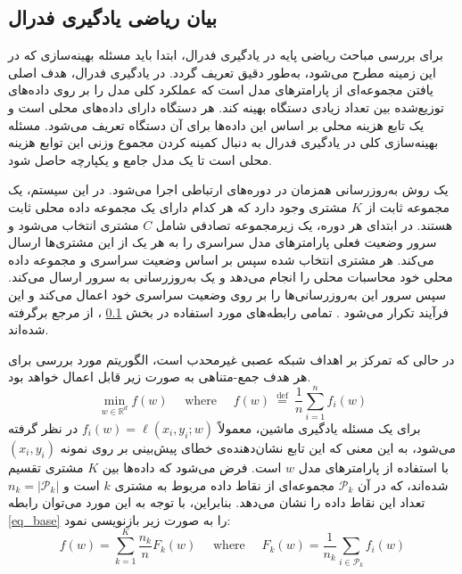 \subsection{
	بیان ریاضی یادگیری فدرال
}\label{sec_FL_math}
برای بررسی مباحث ریاضی پایه در یادگیری فدرال، ابتدا باید مسئله بهینه‌سازی که در این زمینه مطرح می‌شود، به‌طور دقیق تعریف گردد. در یادگیری فدرال، هدف اصلی یافتن مجموعه‌ای از پارامترهای مدل است که عملکرد کلی مدل را بر روی داده‌های توزیع‌شده بین تعداد زیادی دستگاه بهینه کند. هر دستگاه دارای داده‌های محلی است و یک تابع هزینه محلی بر اساس این داده‌ها برای آن دستگاه تعریف می‌شود. مسئله بهینه‌سازی کلی در یادگیری فدرال به دنبال کمینه کردن مجموع وزنی این توابع هزینه محلی است تا یک مدل جامع و یکپارچه حاصل شود.

یک روش به‌روزرسانی همزمان در دوره‌های ارتباطی اجرا می‌شود. در این سیستم، یک مجموعه ثابت از
$K$
مشتری وجود دارد که هر کدام دارای یک مجموعه داده محلی ثابت هستند. در ابتدای هر دوره، یک زیرمجموعه تصادفی شامل
$C$
مشتری‌ انتخاب می‌شود و سرور وضعیت فعلی پارامترهای مدل سراسری را به هر یک از این مشتری‌ها ارسال می‌کند. هر مشتری انتخاب ‌شده سپس بر اساس وضعیت سراسری و مجموعه داده محلی خود محاسبات محلی را انجام می‌دهد و یک به‌روزرسانی به سرور ارسال می‌کند. سپس سرور این به‌روزرسانی‌ها را بر روی وضعیت سراسری خود اعمال می‌کند و این فرآیند تکرار می‌شود
\cite{mcmahan2017communication}.
تمامی رابطه‌های مورد استفاده در بخش
\ref{sec_FL_math}%
، از مرجع 
\cite{mcmahan2017communication} 
برگرفته شده‌اند.

در حالی که تمرکز بر اهداف شبکه عصبی غیرمحدب%
است، الگوریتم مورد بررسی برای هر هدف جمع-متناهی%
به صورت زیر قابل اعمال خواهد بود.
\begin{equation}
	\min _{w \in \mathbb{R}^d} f(w) \quad \text { where } \quad f(w) \stackrel{\text { def }}{=} \frac{1}{n} \sum_{i=1}^n f_i(w)
	\label{eq_base}
\end{equation}
برای یک مسئله یادگیری ماشین، معمولاً
$f_i(w)=\ell\left(x_i, y_i ; w\right)$
در نظر گرفته می‌شود، به این معنی که این تابع نشان‌دهنده‌ی خطای پیش‌بینی بر روی نمونه
$(x_i, y_i)$
با استفاده از پارامترهای مدل
$w$
است. فرض می‌شود که داده‌ها بین
$K$
مشتری تقسیم شده‌اند، که در آن
$\mathcal{P}_k$
مجموعه‌ای از نقاط داده مربوط به مشتری
$k$
است و
$n_k=\left|\mathcal{P}_k\right|$
تعداد این نقاط داده را نشان می‌دهد. بنابراین، با توجه به این مورد می‌توان رابطه
\eqref{eq_base}
را به صورت زیر بازنویسی نمود:
\begin{equation}
	f(w)=\sum_{k=1}^K \frac{n_k}{n} F_k(w) \quad \text { where } \quad F_k(w)=\frac{1}{n_k} \sum_{i \in \mathcal{P}_k} f_i(w)
\end{equation}

